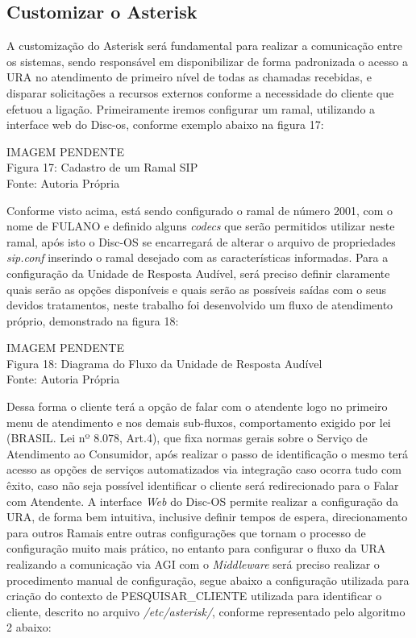 \subsection{Customizar o Asterisk}

A customização do Asterisk será fundamental para realizar a comunicação entre os sistemas, sendo responsável em disponibilizar de forma padronizada o acesso a URA no atendimento de primeiro nível de todas as chamadas recebidas, e disparar solicitações a recursos externos conforme a necessidade do cliente que efetuou a ligação.
Primeiramente iremos configurar um ramal, utilizando a interface web do Disc-os, conforme exemplo abaixo na figura 17:


\begin{center}
	IMAGEM PENDENTE \\
	Figura 17: Cadastro de um Ramal SIP \\
	Fonte: Autoria Própria\\		
\end{center}


Conforme visto acima, está sendo configurado o ramal de número 2001, com o nome de FULANO e definido alguns \textit{codecs} que serão permitidos utilizar neste ramal, após isto o Disc-OS se encarregará de alterar o arquivo de propriedades \textit{sip.conf} inserindo o ramal desejado com as características informadas.
Para a configuração da Unidade de Resposta Audível, será preciso definir claramente quais serão as opções disponíveis e quais serão as possíveis saídas com o seus devidos tratamentos, neste trabalho foi desenvolvido um fluxo de atendimento próprio, demonstrado na figura 18: 

\begin{center}
	IMAGEM PENDENTE \\
	Figura 18: Diagrama do Fluxo da Unidade de Resposta Audível \\
	Fonte: Autoria Própria\\		
\end{center}

Dessa forma o cliente terá a opção de falar com o atendente logo no primeiro menu de atendimento e nos demais sub-fluxos, comportamento exigido por lei (BRASIL. Lei nº 8.078, Art.4), que fixa normas gerais sobre o Serviço de Atendimento ao Consumidor, após realizar o passo de identificação o mesmo terá acesso as opções de serviços automatizados via integração caso ocorra tudo com êxito, caso não seja possível identificar o cliente será redirecionado para o Falar com Atendente.
A interface \textit{Web} do Disc-OS permite realizar a configuração da URA, de forma bem intuitiva, inclusive definir tempos de espera, direcionamento para outros Ramais entre outras configurações que tornam o processo de configuração muito mais prático, no entanto para configurar o fluxo da URA realizando a comunicação via AGI com o \textit{Middleware} será preciso realizar o procedimento manual de configuração, segue abaixo a configuração utilizada para criação do contexto de PESQUISAR\_CLIENTE utilizada para identificar o cliente, descrito no arquivo \textit{/etc/asterisk/}, conforme representado pelo algoritmo 2 abaixo:


